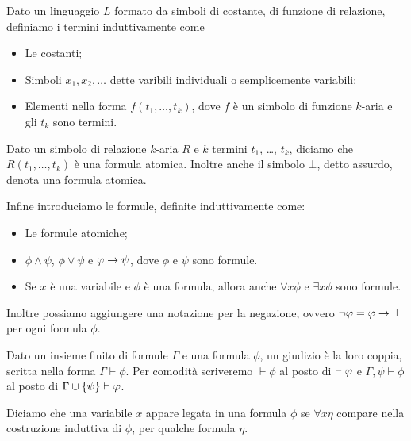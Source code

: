 \documentclass[]{marticle}
\begin{document}
\begin{block}[Definizione]
    Dato un linguaggio $L$ formato da simboli di costante, di funzione di
    relazione, definiamo i termini induttivamente come 
    \begin{itemize}
        \item Le costanti;
        \item Simboli $x_1, x_2,\dots$ dette varibili individuali o
            semplicemente variabili;
        \item Elementi nella forma $f(t_1, \dots, t_k)$, dove $f$ \`e un simbolo
            di funzione $k$-aria e gli $t_k$ sono termini.
    \end{itemize}

    Dato un simbolo di relazione $k$-aria $R$ e $k$ termini $t_1$, \dots, $t_k$,
    diciamo che $R(t_1, \dots, t_k)$ \`e una formula atomica. Inoltre anche il
    simbolo $\bot$, detto assurdo, denota una formula atomica.

    Infine introduciamo le formule, definite induttivamente come:
    \begin{itemize}
        \item Le formule atomiche;
        \item $\phi \land \psi$, $\phi \lor \psi$ e $\varphi \rightarrow \psi$, dove
            $\phi$ e $\psi$ sono formule.
        \item Se $x$ \`e una variabile e $\phi$ \`e una formula, allora anche
            $\forall x \phi$ e $\exists x \phi$ sono formule.
    \end{itemize}
    Inoltre possiamo aggiungere una notazione per la negazione, ovvero $\lnot
    \varphi = \varphi\rightarrow\bot$ per ogni formula $\phi$.

    Dato un insieme finito di formule $\Gamma$ e una formula $\phi$, un giudizio
    \`e la loro coppia, scritta nella forma $\Gamma\vdash \phi$. Per comodit\`a
    scriveremo $\vdash \phi $ al posto di $\empty \vdash \phi$ e $\Gamma ,\psi
    \vdash \phi$ al posto di $\Gamma \cup \{\psi\} \vdash \varphi$.

    Diciamo che una variabile $x$ appare legata in una formula $\phi$ se
    $\forall x\eta$ compare nella costruzione induttiva di $\phi$, per qualche
    formula $\eta$.


\end{block}
\end{document}

